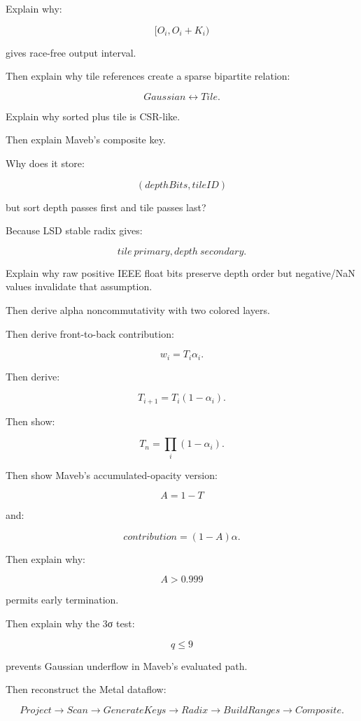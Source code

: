 Explain why:

\[
[O_i,O_i+K_i)
\]

gives race-free output interval.

Then explain why tile references create a sparse bipartite relation:

\[
Gaussian
\leftrightarrow
Tile.
\]

Explain why sorted  plus tile  is CSR-like.

Then explain Maveb's composite key.

Why does it store:

\[
(depthBits,tileID)
\]

but sort depth passes first and tile passes last?

Because LSD stable radix gives:

\[
\boxed{
tile\ primary,
depth\ secondary.
}
\]

Explain why raw positive IEEE float bits preserve depth order but negative/NaN values invalidate that assumption.

Then derive alpha noncommutativity with two colored layers.

Then derive front-to-back contribution:

\[
w_i=
T_i\alpha_i.
\]

Then derive:

\[
T_{i+1}
=
T_i(1-\alpha_i).
\]

Then show:

\[
T_n=
\prod_i(1-\alpha_i).
\]

Then show Maveb's accumulated-opacity version:

\[
A=1-T
\]

and:

\[
contribution=
(1-A)\alpha.
\]

Then explain why:

\[
A>0.999
\]

permits early termination.

Then explain why the 3σ test:

\[
q\le9
\]

prevents Gaussian  underflow in Maveb's evaluated path.

Then reconstruct the Metal dataflow:

\[
Project
\rightarrow
Scan
\rightarrow
GenerateKeys
\rightarrow
Radix
\rightarrow
BuildRanges
\rightarrow
Composite.
\]

